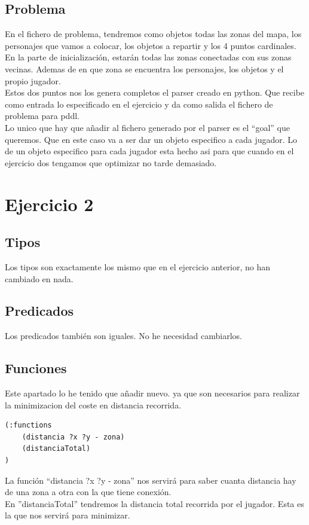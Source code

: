 \documentclass[12pt,a4paper]{article}
\begin{document}
\subsection{Problema}
En el fichero de problema, tendremos como objetos todas las zonas del mapa, los personajes que vamos a colocar, los objetos a repartir y los 4 puntos cardinales. \\
En la parte de inicialización, estarán todas las zonas conectadas con sus zonas vecinas. Ademas de en que zona se encuentra los personajes, los objetos y el propio jugador.\\
Estos dos puntos nos los genera completos el parser creado en python. Que recibe como entrada lo especificado en el ejercicio y da como salida el fichero de problema para pddl. \\
Lo unico que hay que añadir al fichero generado por el parser es el ``goal'' que queremos. Que en este caso va a ser dar un objeto especifico a cada jugador. Lo de un objeto especifico para cada jugador esta hecho asi para que cuando en el ejercicio dos tengamos que optimizar no tarde demasiado.  
\section{Ejercicio 2}
\subsection{Tipos}
Los tipos son exactamente los mismo que en el ejercicio anterior, no han cambiado en nada.
\subsection{Predicados}
Los predicados también son iguales. No  he necesidad cambiarlos.
\subsection{Funciones}
Este apartado lo he tenido que añadir nuevo. ya que son necesarios para realizar la minimizacion del coste en distancia recorrida.
\begin{lstlisting}
(:functions
	(distancia ?x ?y - zona)
	(distanciaTotal)
)
\end{lstlisting}
La función ``distancia ?x ?y - zona'' nos servirá para saber cuanta distancia hay de una zona a otra con la que tiene conexión. \\
En ''distanciaTotal'' tendremos la distancia total recorrida por el jugador. Esta es la que nos servirá para minimizar.
\end{document}
